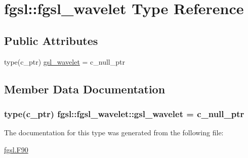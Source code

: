 \hypertarget{structfgsl_1_1fgsl__wavelet}{\section{fgsl\-:\-:fgsl\-\_\-wavelet Type Reference}
\label{structfgsl_1_1fgsl__wavelet}
}
\subsection*{Public Attributes}
\begin{DoxyCompactItemize}
\item 
type(c\-\_\-ptr) \hyperlink{structfgsl_1_1fgsl__wavelet_ae48ffae51c40ed145aac8a7fa07ac6ec}{gsl\-\_\-wavelet} = c\-\_\-null\-\_\-ptr
\end{DoxyCompactItemize}


\subsection{Member Data Documentation}
\hypertarget{structfgsl_1_1fgsl__wavelet_ae48ffae51c40ed145aac8a7fa07ac6ec}{
\subsubsection[{gsl\-\_\-wavelet}]{\setlength{\rightskip}{0pt plus 5cm}type(c\-\_\-ptr) fgsl\-::fgsl\-\_\-wavelet\-::gsl\-\_\-wavelet = c\-\_\-null\-\_\-ptr}}\label{structfgsl_1_1fgsl__wavelet_ae48ffae51c40ed145aac8a7fa07ac6ec}


The documentation for this type was generated from the following file\-:\begin{DoxyCompactItemize}
\item 
\hyperlink{fgsl_8F90}{fgsl.\-F90}\end{DoxyCompactItemize}
